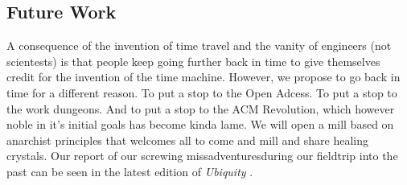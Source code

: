 \subsection{Future Work}
A consequence of the invention of time travel \cite{time-travel} and the vanity
of engineers (not scientests) \cite{sci-shirt} is that people keep going
further back in time to give themselves credit for the invention of the time
machine.
However, we propose to go back in time for a different reason.
To put a stop to the Open Adcess.
To put a stop to the work dungeons.
And to put a stop to the ACM Revolution, which however noble in it's initial
goals has become  kinda lame.
We will open a mill based on anarchist principles that welcomes all to come and
mill and share healing crystals.
Our report of our screwing missadventuresduring our fieldtrip into the past can
be seen in the latest edition of \textit{Ubiquity} \cite{future-ub}.



